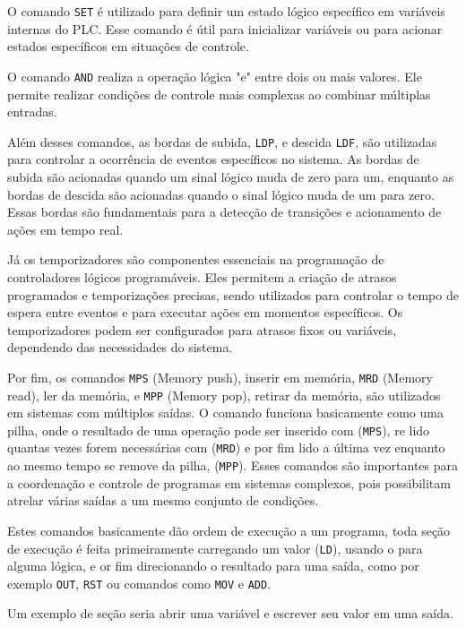 O comando \lstinline{SET} é utilizado para definir um estado lógico específico em variáveis internas do PLC. Esse comando é útil para inicializar variáveis ou para acionar estados específicos em situações de controle.

O comando \lstinline{AND} realiza a operação lógica "e" entre dois ou mais valores. Ele permite realizar condições de controle mais complexas ao combinar múltiplas entradas.

Além desses comandos, as bordas de subida, \lstinline{LDP}, e descida \lstinline{LDF}, são utilizadas para controlar a ocorrência de eventos específicos no sistema. As bordas de subida são acionadas quando um sinal lógico muda de zero para um, enquanto as bordas de descida são acionadas quando o sinal lógico muda de um para zero. Essas bordas são fundamentais para a detecção de transições e acionamento de ações em tempo real.

Já os temporizadores são componentes essenciais na programação de controladores lógicos programáveis. Eles permitem a criação de atrasos programados e temporizações precisas, sendo utilizados para controlar o tempo de espera entre eventos e para executar ações em momentos específicos. Os temporizadores podem ser configurados para atrasos fixos ou variáveis, dependendo das necessidades do sistema.

Por fim, os comandos \lstinline{MPS} (Memory push), inserir em memória, \lstinline{MRD} (Memory read), ler da memória, e \lstinline{MPP} (Memory pop), retirar da memória, são utilizados em sistemas com múltiplos saídas. O comando funciona basicamente como uma pilha, onde o resultado de uma operação pode ser inserido com (\lstinline{MPS}), re lido quantas vezes forem necessárias com (\lstinline{MRD}) e por fim lido a última vez enquanto ao mesmo tempo se remove da pilha, (\lstinline{MPP}). Esses comandos são importantes para a coordenação e controle de programas em sistemas complexos, pois possibilitam atrelar várias saídas a um mesmo conjunto de condições.

Estes comandos basicamente dão ordem de execução a um programa, toda seção de execução é feita primeiramente carregando um valor (\lstinline{LD}), usando o para alguma lógica, e or fim direcionando o resultado para uma saída, como por exemplo \lstinline{OUT}, \lstinline{RST} ou comandos como \lstinline{MOV} e \lstinline{ADD}. 

Um exemplo de seção seria abrir uma variável e escrever seu valor em uma saída.



